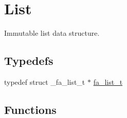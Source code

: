 \hypertarget{group___fa_list}{\section{List}
\label{group___fa_list}
}


Immutable list data structure.  


\subsection*{Typedefs}
\begin{DoxyCompactItemize}
\item 
typedef struct \-\_\-fa\-\_\-list\-\_\-t $\ast$ \hyperlink{group___fa_list_ga35ecb12ab934ded0cce0bcf28e3bc5d2}{fa\-\_\-list\-\_\-t}
\end{DoxyCompactItemize}
\subsection*{Functions}
